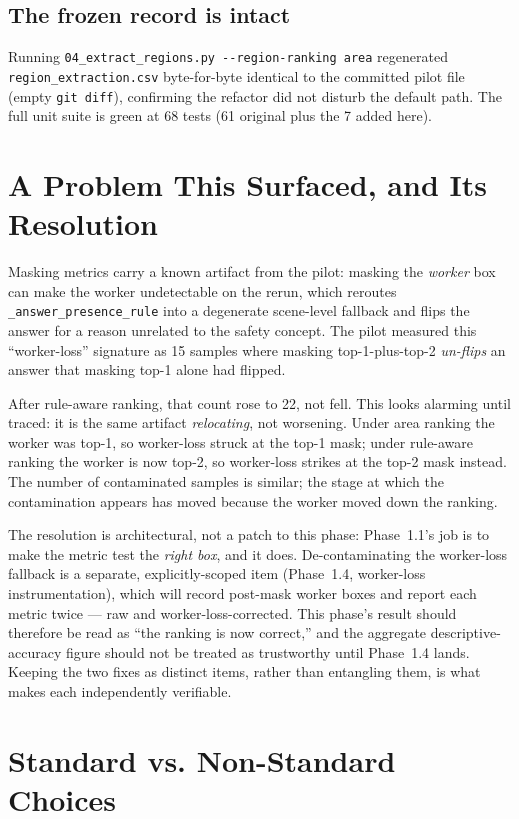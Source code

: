 \subsection{The frozen record is intact}

Running \texttt{04\_extract\_regions.py -{}-region-ranking area} regenerated
\texttt{region\_extraction.csv} byte-for-byte identical to the committed pilot file (empty
\texttt{git diff}), confirming the refactor did not disturb the default path. The full unit suite is
green at 68 tests (61 original plus the 7 added here).

\section{A Problem This Surfaced, and Its Resolution}

Masking metrics carry a known artifact from the pilot: masking the \emph{worker} box can make the
worker undetectable on the rerun, which reroutes \texttt{\_answer\_presence\_rule} into a degenerate
scene-level fallback and flips the answer for a reason unrelated to the safety concept. The pilot
measured this ``worker-loss'' signature as 15 samples where masking top-1-plus-top-2 \emph{un-flips}
an answer that masking top-1 alone had flipped.

After rule-aware ranking, that count rose to 22, not fell. This looks alarming until traced: it is
the same artifact \emph{relocating}, not worsening. Under area ranking the worker was top-1, so
worker-loss struck at the top-1 mask; under rule-aware ranking the worker is now top-2, so worker-loss
strikes at the top-2 mask instead. The number of contaminated samples is similar; the stage at which
the contamination appears has moved because the worker moved down the ranking.

The resolution is architectural, not a patch to this phase: Phase~1.1's job is to make the metric
test the \emph{right box}, and it does. De-contaminating the worker-loss fallback is a separate,
explicitly-scoped item (Phase~1.4, worker-loss instrumentation), which will record post-mask worker
boxes and report each metric twice --- raw and worker-loss-corrected. This phase's result should
therefore be read as ``the ranking is now correct,'' and the aggregate descriptive-accuracy figure
should not be treated as trustworthy until Phase~1.4 lands. Keeping the two fixes as distinct items,
rather than entangling them, is what makes each independently verifiable.

\section{Standard vs. Non-Standard Choices}

